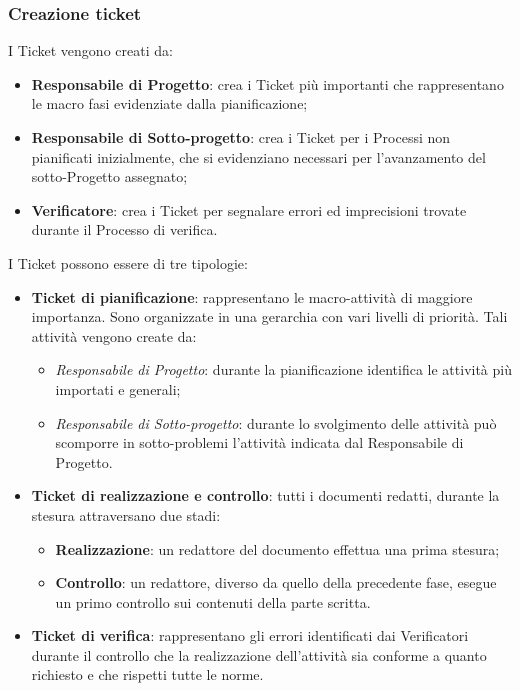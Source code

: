 \subsubsection{Creazione ticket}
 
  I Ticket vengono creati da:
 \begin{itemize}
 

    \item \textbf{Responsabile di Progetto}: crea i Ticket più importanti che rappresentano le macro fasi evidenziate dalla pianificazione; 
	\item \textbf{Responsabile di Sotto-progetto}: crea i Ticket per i Processi non pianificati inizialmente, che si evidenziano necessari per l’avanzamento del sotto-Progetto assegnato; 
	\item \textbf{Verificatore}: crea i Ticket per segnalare errori ed imprecisioni trovate durante il Processo di verifica. 
 \end{itemize}


I Ticket possono essere di tre tipologie:
\begin{itemize}


\item \textbf{Ticket di pianificazione}: rappresentano le macro-attività di maggiore importanza. Sono organizzate in una gerarchia con vari livelli di priorità.
 Tali attività vengono create da: 
\begin{itemize}
\item \emph{Responsabile di Progetto}: durante la pianificazione identifica le attività più importati e generali; 
\item \emph{Responsabile di Sotto-progetto}: durante lo svolgimento delle attività può scomporre in sotto-problemi l’attività indicata dal Responsabile di Progetto. 
\end{itemize}


\item \textbf{Ticket di realizzazione e controllo}: tutti i documenti redatti, durante la stesura attraversano due stadi: 
\begin{itemize}
\item \textbf{Realizzazione}: un redattore del documento effettua una prima stesura; 
\item \textbf{Controllo}: un redattore, diverso da quello della precedente fase, esegue un primo controllo sui contenuti della parte scritta. 
\end{itemize}


\item \textbf{Ticket di verifica}: rappresentano gli errori identificati dai Verificatori durante 
il controllo che la realizzazione dell'attività sia conforme a quanto richiesto e che 
rispetti tutte le norme.
\end{itemize}



